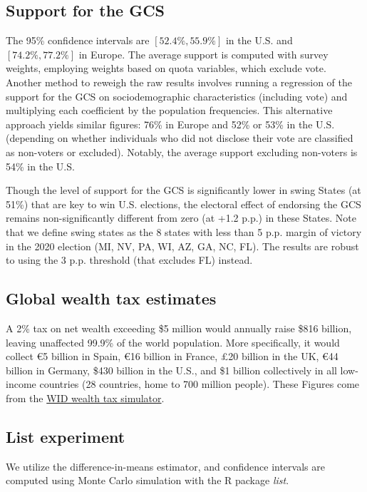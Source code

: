 \begin{small}
\subsection*{\small Support for the GCS} The 95\% confidence intervals are $[52.4\%, 55.9\%]$ in the U.S. and $[74.2\%, 77.2\%]$ in Europe. The average support is computed with survey weights, employing weights based on quota variables, which exclude vote. Another method to reweigh the raw results involves running a regression of the support for the GCS on sociodemographic characteristics (including vote) and multiplying each coefficient by the population frequencies. This alternative approach yields similar figures: 76\% in Europe and 52\% or 53\% in the U.S. (depending on whether individuals who did not disclose their vote are classified as non-voters or excluded). Notably, the average support excluding non-voters is 54\% in the U.S. 

Though the level of support for the GCS is significantly lower in swing States (at 51\%) that are key to win U.S. elections, the electoral effect of endorsing the GCS remains non-significantly different from zero (at +1.2 p.p.) in these States. Note that we define swing states as the 8 states with less than 5 p.p. margin of victory in the 2020 election (MI, NV, PA, WI, AZ, GA, NC, FL). The results are robust to using the 3 p.p. threshold (that excludes FL) instead. 

\subsection*{\small Global wealth tax estimates}
A 2\% tax on net wealth exceeding \$5 million would annually raise \$816 billion, leaving unaffected 99.9\% of the world population. More specifically, it would collect \euro{}5 billion in Spain, \euro{}16 billion in France, £20 billion in the UK, \euro{}44 billion in Germany, \$430 billion in the U.S., and \$1 billion collectively in all low-income countries (28 countries, home to 700 million people). These Figures come from the \href{https://wid.world/world-wealth-tax-simulator/}{WID wealth tax simulator}.\cite{chancel_world_2022}

\subsection*{\small List experiment}
We utilize the difference-in-means estimator, and confidence intervals are computed using Monte Carlo simulation with the R package \textit{list}.\cite{imai_multivariate_2011}


\end{small}
